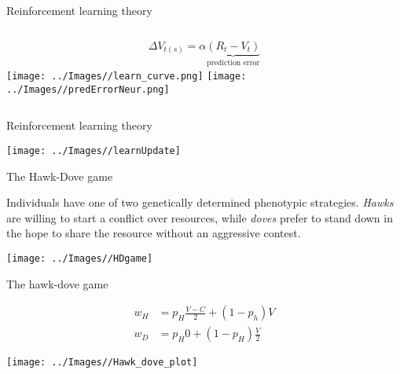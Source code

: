 \documentclass[
  ignorenonframetext,
]{beamer}
\begin{document}
\begin{frame}{Reinforcement learning theory}
\protect\hypertarget{reinforcement-learning-theory}{}

\begin{columns}[T]
 \begin{equation*}
  \Delta V_{t(s)}=\alpha \underbrace{(R_t-V_t)}_\text{prediction error}
  \end{equation*}
  \pause
  \texttt{[image: ../Images//learn\_curve.png]}
  \pause
  \texttt{[image: ../Images//predErrorNeur.png]}
\end{columns}

\end{frame}

\begin{frame}{Reinforcement learning theory}
\protect\hypertarget{reinforcement-learning-theory-1}{}

\begin{center}\texttt{[image: ../Images//learnUpdate]} \end{center}

\end{frame}

\begin{frame}{The Hawk-Dove game}
\protect\hypertarget{the-hawk-dove-game}{}

Individuals have one of two genetically determined phenotypic
strategies. \emph{Hawks} are willing to start a conflict over resources,
while \emph{doves} prefer to stand down in the hope to share the
resource without an aggressive contest.

\begin{center}\texttt{[image: ../Images//HDgame]} \end{center}

\end{frame}

\begin{frame}{The hawk-dove game}
\protect\hypertarget{the-hawk-dove-game-1}{}

\begin{align*}
w_H &= p_H \frac{V-C}{2}+(1-p_h) V\\
w_D &= p_H 0 + (1-p_H)\frac{V}{2}
\end{align*} \vspace{-0.8cm}

\begin{center}\texttt{[image: ../Images//Hawk\_dove\_plot]} \end{center}

\end{frame}
\end{document}
